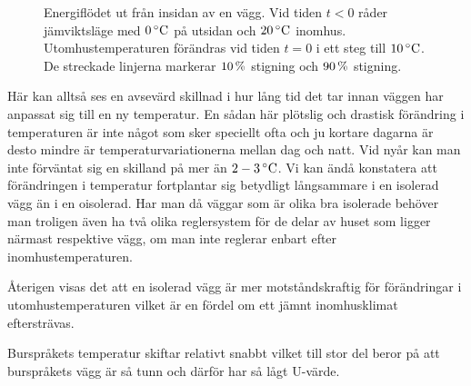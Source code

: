 \begin{figure}[hpbt]
\centering
{}\vspace{5mm}

\caption{\label{fig:energyflow_trans} Energiflödet ut från insidan av en vägg. Vid tiden $t<0$ råder jämviktsläge med $\unit[0]{^\circ C}$ på utsidan och $\unit[20]{^\circ C}$ inomhus. Utomhustemperaturen förändras vid tiden $t=0$ i ett steg till $\unit[10]{^\circ C}$. De streckade linjerna markerar $\unit[10]{\%}$ stigning och $\unit[90]{\%}$ stigning.}

\end{figure}

Här kan alltså ses en avsevärd skillnad i hur lång tid det tar innan väggen har anpassat sig till en ny temperatur. En sådan här plötslig och drastisk förändring i temperaturen är inte något som sker speciellt ofta och ju kortare dagarna är desto mindre är temperaturvariationerna mellan dag och natt\cite{SMHItempskillnad}.
Vid nyår kan man inte förväntat sig en skilland på mer än $\unit[2-3]{^\circ C}$. Vi kan ändå konstatera att förändringen i temperatur fortplantar sig betydligt långsammare i en isolerad vägg än i en oisolerad. Har man då väggar som är olika bra isolerade behöver man troligen även ha två olika reglersystem för de delar av huset som ligger närmast respektive vägg, om man inte reglerar enbart efter inomhustemperaturen. 

Återigen visas det att en isolerad vägg är mer motståndskraftig för förändringar i utomhustemperaturen vilket är en fördel om ett jämnt inomhusklimat eftersträvas.

Burspråkets temperatur skiftar relativt snabbt vilket till stor del beror på att burspråkets vägg är så tunn och därför har så lågt U-värde.
